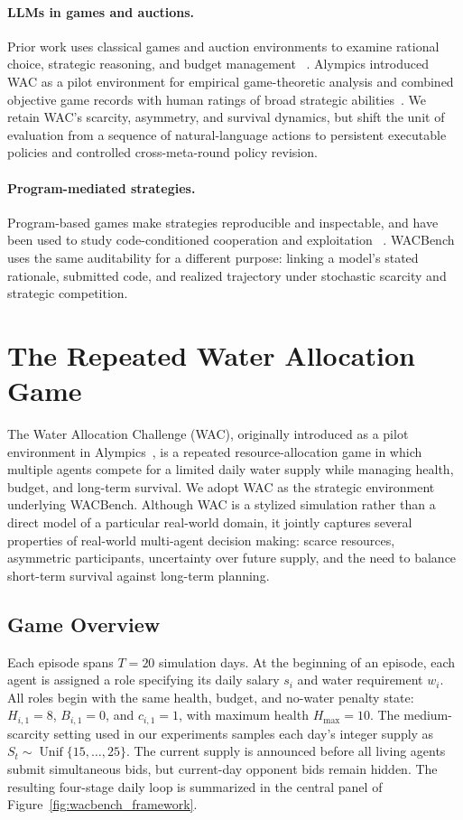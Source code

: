 \documentclass[letterpaper]{article} %
\begin{document}
\paragraph{LLMs in games and auctions.}
Prior work uses classical games and auction environments to examine
rational choice, strategic reasoning, and budget management
~\cite{fan2024rational,duan2024gtbench,huang2025gamabench,chen2023aucarena}.
Alympics introduced WAC as a pilot environment for empirical game-theoretic
analysis and combined objective game records with human ratings of broad
strategic abilities~\cite{mao2025alympics}. We retain WAC's scarcity,
asymmetry, and survival dynamics, but shift the unit of evaluation from a
sequence of natural-language actions to persistent executable policies and
controlled cross-meta-round policy revision.

\paragraph{Program-mediated strategies.}
Program-based games make strategies reproducible and inspectable, and have
been used to study code-conditioned cooperation and exploitation
~\cite{sistla2025opensourcegames}. WACBench uses the same auditability for a
different purpose: linking a model's stated rationale, submitted code, and
realized trajectory under stochastic scarcity and strategic competition.
\section{The Repeated Water Allocation Game}
The Water Allocation Challenge (WAC), originally introduced
as a pilot environment in Alympics~\cite{mao2025alympics},
is a repeated resource-allocation game in which multiple agents compete for a limited daily water supply while managing health, budget, and long-term survival. We adopt WAC as the strategic environment underlying WACBench. Although WAC is a stylized simulation rather than a direct model of a particular real-world domain, it jointly captures several properties of real-world multi-agent decision making: scarce resources, asymmetric participants, uncertainty over future supply, and the need to balance short-term survival against long-term planning.

\subsection{Game Overview}

Each episode spans $T=20$ simulation days. At the beginning of an
episode, each agent is assigned a role specifying its daily salary $s_i$
and water requirement $w_i$. All roles begin with the same health,
budget, and no-water penalty state: $H_{i,1}=8$, $B_{i,1}=0$, and
$c_{i,1}=1$, with maximum health $H_{\max}=10$. The medium-scarcity
setting used in our experiments samples each day's integer supply as
$S_t\sim\operatorname{Unif}\{15,\ldots,25\}$. The current supply is
announced before all living agents submit simultaneous bids, but
current-day opponent bids remain hidden. The resulting four-stage daily loop
is summarized in the central panel of Figure~\ref{fig:wacbench_framework}.
\end{document}
